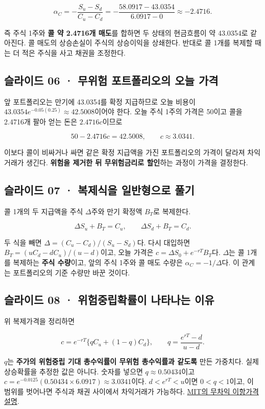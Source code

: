 \documentclass[11pt,a4paper]{article}
\begin{document}
\[
\alpha_C=-\frac{S_u-S_d}{C_u-C_d}
=-\frac{58.0917-43.0354}{6.0917-0}
\approx-2.4716.
\]

즉 주식 1주와 \textbf{콜 약 2.4716개 매도}를 합하면 두 상태의 현금흐름이 약 43.0354로 같아진다. 콜 매도의 상승손실이 주식의 상승이익을 상쇄한다. 반대로 콜 1개를 복제할 때는 더 적은 주식을 사고 채권을 조정한다.\par

\subsection{슬라이드 06 · 무위험 포트폴리오의 오늘 가격}
앞 포트폴리오는 만기에 43.0354를 확정 지급하므로 오늘 비용이 $43.0354e^{-0.05(0.25)}\approx42.5008$이어야 한다. 오늘 주식 1주의 가격은 50이고 콜을 2.4716개 팔아 얻는 돈은 $2.4716c$이므로\par

\[
50-2.4716c=42.5008,\qquad c\approx3.0341.
\]

이보다 콜이 비싸거나 싸면 같은 확정 지급액을 가진 포트폴리오의 가격이 달라져 차익거래가 생긴다. \textbf{위험을 제거한 뒤 무위험금리로 할인}하는 과정이 가격을 결정한다.\par

\subsection{슬라이드 07 · 복제식을 일반형으로 풀기}
콜 1개의 두 지급액을 주식 $\Delta$주와 만기 확정액 $B_T$로 복제한다.\par

\[
\Delta S_u+B_T=C_u,\qquad
\Delta S_d+B_T=C_d.
\]

두 식을 빼면 $\Delta=(C_u-C_d)/(S_u-S_d)$다. 다시 대입하면 $B_T=(uC_d-dC_u)/(u-d)$이고, 오늘 가격은 $c=\Delta S_0+e^{-rT}B_T$다. $\Delta$는 콜 1개를 복제하는 \textbf{주식 수량}이고, 앞의 주식 1주와 콜 매도 수량은 $\alpha_C=-1/\Delta$다. 이 관계는 포트폴리오의 기준 수량만 바꾼 것이다.\par

\subsection{슬라이드 08 · 위험중립확률이 나타나는 이유}
위 복제가격을 정리하면\par

\[
c=e^{-rT}\{qC_u+(1-q)C_d\},\qquad
q=\frac{e^{rT}-d}{u-d}.
\]

$q$는 \textbf{주가의 위험중립 기대 총수익률이 무위험 총수익률과 같도록} 만든 가중치다. 실제 상승확률을 추정한 값은 아니다. 숫자를 넣으면 $q\approx0.50434$이고 $c=e^{-0.0125}(0.50434\times6.0917)\approx3.0341$이다. $d<e^{rT}<u$이면 $0<q<1$이고, 이 범위를 벗어나면 주식과 채권 사이에서 차익거래가 가능하다. \href{https://ocw.mit.edu/courses/15-401-finance-theory-i-fall-2008/pages/video-lectures-and-slides/options/}{MIT의 무차익 이항가격 설명}.\par
\end{document}
